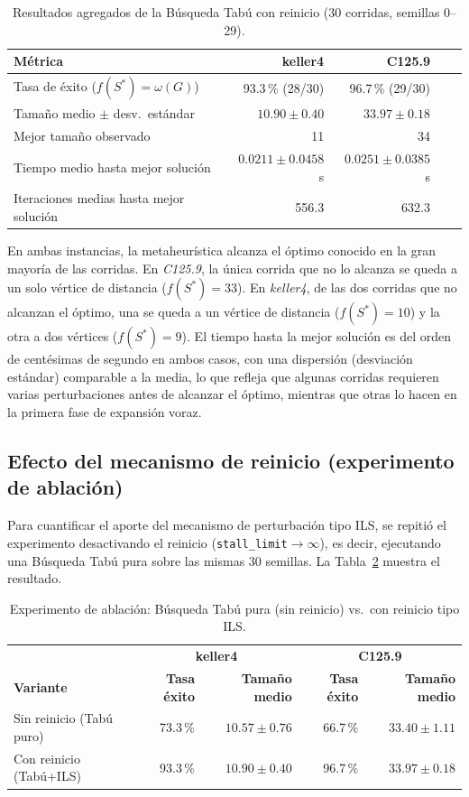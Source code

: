 \begin{table}[H]
\centering
\caption{Resultados agregados de la Búsqueda Tabú con reinicio (30 corridas, semillas 0--29).}
\label{tab:resultados_meta}
\begin{tabular}{lrrrr}
\hline
\textbf{Métrica} & \textbf{keller4} & \textbf{C125.9} \\
\hline
Tasa de éxito ($f(S^*)=\omega(G)$) & 93.3\,\% (28/30) & 96.7\,\% (29/30) \\
Tamaño medio $\pm$ desv.\ estándar & $10.90 \pm 0.40$ & $33.97 \pm 0.18$ \\
Mejor tamaño observado & 11 & 34 \\
Tiempo medio hasta mejor solución & $0.0211 \pm 0.0458$ s & $0.0251 \pm 0.0385$ s \\
Iteraciones medias hasta mejor solución & 556.3 & 632.3 \\
\hline
\end{tabular}
\end{table}

En ambas instancias, la metaheurística alcanza el óptimo conocido en la gran mayoría de las corridas. En \textit{C125.9}, la única corrida que no lo alcanza se queda a un solo vértice de distancia ($f(S^*)=33$). En \textit{keller4}, de las dos corridas que no alcanzan el óptimo, una se queda a un vértice de distancia ($f(S^*)=10$) y la otra a dos vértices ($f(S^*)=9$). El tiempo hasta la mejor solución es del orden de centésimas de segundo en ambos casos, con una dispersión (desviación estándar) comparable a la media, lo que refleja que algunas corridas requieren varias perturbaciones antes de alcanzar el óptimo, mientras que otras lo hacen en la primera fase de expansión voraz.

\subsection{Efecto del mecanismo de reinicio (experimento de ablación)}

Para cuantificar el aporte del mecanismo de perturbación tipo ILS, se repitió el experimento desactivando el reinicio (\texttt{stall\_limit}$\to\infty$), es decir, ejecutando una Búsqueda Tabú pura sobre las mismas 30 semillas. La Tabla~\ref{tab:ablacion} muestra el resultado.

\begin{table}[H]
\centering
\scriptsize
\setlength{\tabcolsep}{3pt}
\caption{Experimento de ablación: Búsqueda Tabú pura (sin reinicio) vs.\ con reinicio tipo ILS.}
\label{tab:ablacion}
\begin{tabular}{@{}lrrrr@{}}
\hline
 & \multicolumn{2}{c}{\textbf{keller4}} & \multicolumn{2}{c}{\textbf{C125.9}} \\
\textbf{Variante} & \textbf{Tasa éxito} & \textbf{Tamaño medio} & \textbf{Tasa éxito} & \textbf{Tamaño medio} \\
\hline
Sin reinicio (Tabú puro) & 73.3\,\% & $10.57 \pm 0.76$ & 66.7\,\% & $33.40 \pm 1.11$ \\
Con reinicio (Tabú+ILS)  & 93.3\,\% & $10.90 \pm 0.40$ & 96.7\,\% & $33.97 \pm 0.18$ \\
\hline
\end{tabular}
\end{table}


